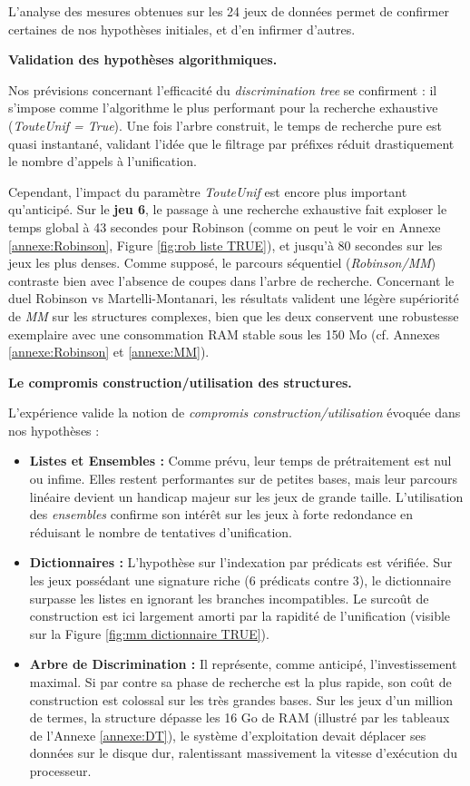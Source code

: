 \documentclass[11pt]{article}
\newenvironment{paraph}[1]{%
  \medskip
  \noindent\textbf{#1.}\quad

  \vspace{0.2cm}
}{%
  \medskip
}
\begin{document}
L'analyse des mesures obtenues sur les 24 jeux de données permet de confirmer certaines de nos hypothèses initiales, et d'en infirmer d'autres.

\begin{paraph}{Validation des hypothèses algorithmiques}
    Nos prévisions concernant l'efficacité du \textit{discrimination tree} se confirment : il s'impose comme l'algorithme le plus performant pour la recherche exhaustive (\textit{TouteUnif = True}). Une fois l'arbre construit, le temps de recherche pure est quasi instantané, validant l'idée que le filtrage par préfixes réduit drastiquement le nombre d'appels à l'unification. 

    Cependant, l'impact du paramètre \textit{TouteUnif} est encore plus important qu'anticipé. Sur le \textbf{jeu 6}, le passage à une recherche exhaustive fait exploser le temps global à 43 secondes pour Robinson (comme on peut le voir en Annexe \ref{annexe:Robinson}, Figure \ref{fig:rob liste TRUE}), et jusqu'à 80 secondes sur les jeux les plus denses. Comme supposé, le parcours séquentiel (\textit{Robinson/MM}) contraste bien avec l'absence de coupes dans l'arbre de recherche. Concernant le duel Robinson vs Martelli-Montanari, les résultats valident une légère supériorité de \textit{MM} sur les structures complexes, bien que les deux conservent une robustesse exemplaire avec une consommation RAM stable sous les 150 Mo (cf. Annexes \ref{annexe:Robinson} et \ref{annexe:MM}).
\end{paraph}

\begin{paraph}{Le compromis construction/utilisation des structures}
    L'expérience valide la notion de \textit{compromis construction/utilisation} évoquée dans nos hypothèses :
    \begin{itemize}
        \item \textbf{Listes et Ensembles :} Comme prévu, leur temps de prétraitement est nul ou infime. Elles restent performantes sur de petites bases, mais leur parcours linéaire devient un handicap majeur sur les jeux de grande taille. L'utilisation des \textit{ensembles} confirme son intérêt sur les jeux à forte redondance en réduisant le nombre de tentatives d'unification.
        \item \textbf{Dictionnaires :} L'hypothèse sur l'indexation par prédicats est vérifiée. Sur les jeux possédant une signature riche (6 prédicats contre 3), le dictionnaire surpasse les listes en ignorant les branches incompatibles. Le surcoût de construction est ici largement amorti par la rapidité de l'unification (visible sur la Figure \ref{fig:mm dictionnaire TRUE}).
        \item \textbf{Arbre de Discrimination :} Il représente, comme anticipé, l'investissement maximal. Si par contre sa phase de recherche est la plus rapide, son coût de construction est colossal sur les très grandes bases. Sur les jeux d'un million de termes, la structure dépasse les 16 Go de RAM (illustré par les tableaux de l'Annexe \ref{annexe:DT}), le système d'exploitation devait déplacer ses données sur le disque dur, ralentissant massivement la vitesse d'exécution du processeur.
    \end{itemize}
\end{paraph}
\end{document}
